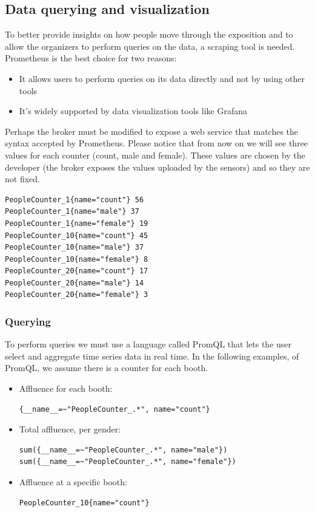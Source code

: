 \documentclass[a4paper]{article}
\begin{document}
\subsection{Data querying and visualization}
To better provide insights on how people move through the exposition and to allow the organizers to perform queries on the data, a scraping tool is needed.
Prometheus is the best choice for two reasons:
\begin{itemize}
    \item It allows users to perform queries on its data directly and not by using other tools
    \item It's widely supported by data visualization tools like Grafana
\end{itemize}{}
Perhaps the broker must be modified to expose a web service that matches the syntax accepted by Prometheus.
Please notice that from now on we will see three values for each counter (count, male and female). These values are chosen by the developer (the broker exposes the values uploaded by the sensors) and so they are not fixed.

\begin{lstlisting}
PeopleCounter_1{name="count"} 56
PeopleCounter_1{name="male"} 37
PeopleCounter_1{name="female"} 19
PeopleCounter_10{name="count"} 45
PeopleCounter_10{name="male"} 37
PeopleCounter_10{name="female"} 8
PeopleCounter_20{name="count"} 17
PeopleCounter_20{name="male"} 14
PeopleCounter_20{name="female"} 3
\end{lstlisting}{}

\subsubsection{Querying}
To perform queries we must use a language called PromQL that lets the user select and aggregate time series data in real time.
In the following examples, of PromQL, we assume there is a counter for each booth.
\begin{itemize}
    \item Affluence for each booth:
    \begin{lstlisting}[breaklines=true]
{__name__=~"PeopleCounter_.*", name="count"}
    \end{lstlisting}{}
    \item Total affluence, per gender:
    \begin{lstlisting}[breaklines=true]
sum({__name__=~"PeopleCounter_.*", name="male"})
sum({__name__=~"PeopleCounter_.*", name="female"})
    \end{lstlisting}{}
    \item Affluence at a specific booth:
    \begin{lstlisting}[breaklines=true]
PeopleCounter_10{name="count"}
    \end{lstlisting}{}
\end{itemize}{}
\end{document}
